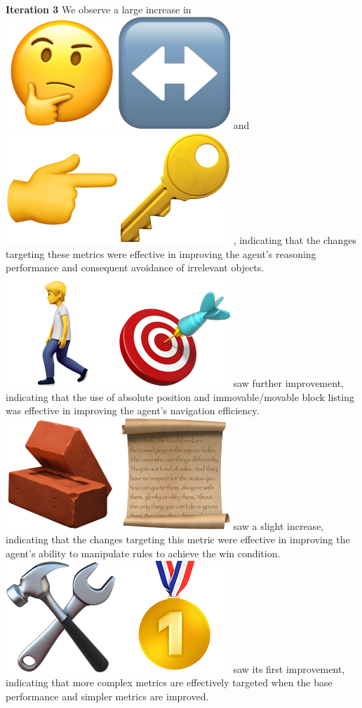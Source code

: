 \textbf{Iteration 3} We observe a large increase in
\includegraphics[scale=0.07]{figs/emojis/emoji_4.png}
and
\includegraphics[scale=0.07]{figs/emojis/emoji_6.png}
, indicating that the changes targeting these metrics were effective in
improving the agent's reasoning performance and consequent avoidance of
irrelevant objects.
\includegraphics[scale=0.07]{figs/emojis/emoji_3.png}
saw further improvement, indicating that the use of absolute position and
immovable/movable block listing was effective in improving the agent's
navigation efficiency.
\includegraphics[scale=0.07]{figs/emojis/emoji_7.png}
saw a slight increase, indicating that the changes targeting this metric were
effective in improving the agent's ability to manipulate rules to achieve the
win condition.
\includegraphics[scale=0.07]{figs/emojis/emoji_5.png}
saw its first improvement, indicating that more complex metrics are effectively
targeted when the base performance and simpler metrics are improved.

